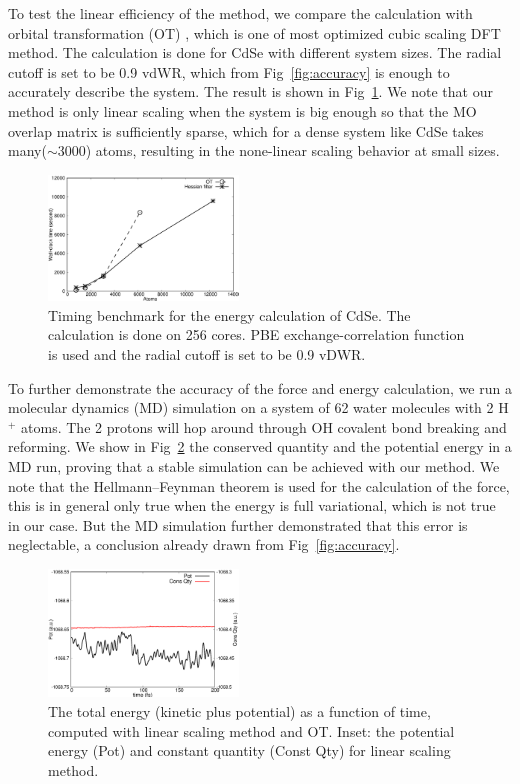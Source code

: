 \documentclass[aps,prl,twocolumn,reprint,amsmath,amssymb]{revtex4-1}
\begin{document}
\label{marker:performance}To test the linear efficiency of the method, we compare the calculation with orbital transformation (OT) \cite{weber2008direct,vandevondele2003efficient}, which is one of most optimized cubic scaling DFT method. The calculation is done for CdSe with different system sizes. The radial cutoff is set to be 0.9 vdWR, which from Fig~\ref{fig:accuracy} is enough to accurately describe the system. The result is shown in Fig~\ref{fig:scaling}. We note that our method is only linear scaling when the system is big enough so that the MO overlap matrix is sufficiently sparse, which for a dense system like CdSe takes many($\sim 3000$) atoms, resulting in the none-linear scaling behavior at small sizes.

\begin{figure}
\includegraphics[width=0.45\textwidth]{timing}
\caption{Timing benchmark for the energy calculation of CdSe. The calculation is done on 256 cores. PBE exchange-correlation function is used and the radial cutoff is set to be 0.9 vDWR.}
\label{fig:scaling}
\end{figure}


\label{marker:moldyn}To further demonstrate the accuracy of the force and energy calculation, we run a molecular dynamics (MD) simulation on a system of 62 water molecules with 2 H$^+$ atoms. The 2 protons will hop around through OH covalent bond breaking and reforming. We show in Fig~\ref{fig:md} the conserved quantity and the potential energy in a MD run, proving that a stable simulation can be achieved with our method. We note that the Hellmann–Feynman theorem\cite{feynman1939forces} is used for the calculation of the force, this is in general only true when the energy is full variational, which is not true in our case. But the MD simulation further demonstrated that this error is neglectable, a conclusion already drawn from Fig~\ref{fig:accuracy}.

\begin{figure}
\includegraphics[width=0.45\textwidth]{const}
\caption{The total energy (kinetic plus potential) as a function of time, computed with linear scaling method and OT. Inset: the potential energy (Pot) and constant quantity (Const Qty) for linear scaling method.}
\label{fig:md}
\end{figure}
\end{document}
